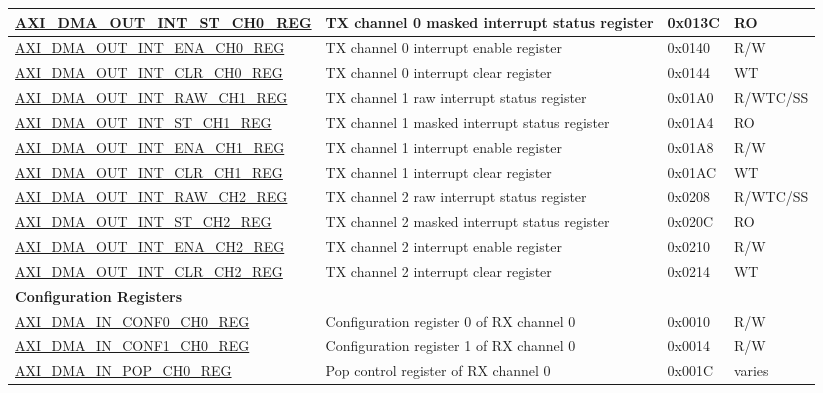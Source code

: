 \begin{longtable}{ | l | p{10cm} | p{1.3cm} | l | }
\hyperref[regdesc:AXIDMAOUTINTSTCHNREG]{AXI\_DMA\_OUT\_INT\_ST\_CH0\_REG} & TX channel 0 masked interrupt status register & 0x013C & RO \\ \hline
\hyperref[regdesc:AXIDMAOUTINTENACHNREG]{AXI\_DMA\_OUT\_INT\_ENA\_CH0\_REG} & TX channel 0 interrupt enable register & 0x0140 & R/W \\ \hline
\hyperref[regdesc:AXIDMAOUTINTCLRCHNREG]{AXI\_DMA\_OUT\_INT\_CLR\_CH0\_REG} & TX channel 0 interrupt clear register  & 0x0144 & WT \\ \hline
\hyperref[regdesc:AXIDMAOUTINTRAWCHNREG]{AXI\_DMA\_OUT\_INT\_RAW\_CH1\_REG} & TX channel 1 raw interrupt status register & 0x01A0 & R/WTC/SS \\ \hline
\hyperref[regdesc:AXIDMAOUTINTSTCHNREG]{AXI\_DMA\_OUT\_INT\_ST\_CH1\_REG} & TX channel 1 masked interrupt status register & 0x01A4 & RO \\ \hline
\hyperref[regdesc:AXIDMAOUTINTENACHNREG]{AXI\_DMA\_OUT\_INT\_ENA\_CH1\_REG} & TX channel 1 interrupt enable register & 0x01A8 & R/W \\ \hline
\hyperref[regdesc:AXIDMAOUTINTCLRCHNREG]{AXI\_DMA\_OUT\_INT\_CLR\_CH1\_REG} & TX channel 1 interrupt clear register  & 0x01AC & WT \\ \hline
\hyperref[regdesc:AXIDMAOUTINTRAWCHNREG]{AXI\_DMA\_OUT\_INT\_RAW\_CH2\_REG} & TX channel 2 raw interrupt status register & 0x0208 & R/WTC/SS \\ \hline
\hyperref[regdesc:AXIDMAOUTINTSTCHNREG]{AXI\_DMA\_OUT\_INT\_ST\_CH2\_REG} & TX channel 2 masked interrupt status register & 0x020C & RO \\ \hline
\hyperref[regdesc:AXIDMAOUTINTENACHNREG]{AXI\_DMA\_OUT\_INT\_ENA\_CH2\_REG} & TX channel 2 interrupt enable register & 0x0210 & R/W \\ \hline
\hyperref[regdesc:AXIDMAOUTINTCLRCHNREG]{AXI\_DMA\_OUT\_INT\_CLR\_CH2\_REG} & TX channel 2 interrupt clear register  & 0x0214 & WT \\ \hline
\multicolumn{4}{|l|}{\textbf{Configuration Registers}} \\ \hline
\hyperref[regdesc:AXIDMAINCONF0CHNREG]{AXI\_DMA\_IN\_CONF0\_CH0\_REG} & Configuration register 0 of RX channel 0 & 0x0010 & R/W \\ \hline
\hyperref[regdesc:AXIDMAINCONF1CHNREG]{AXI\_DMA\_IN\_CONF1\_CH0\_REG} & Configuration register 1 of RX channel 0 & 0x0014 & R/W \\ \hline
\hyperref[regdesc:AXIDMAINPOPCHNREG]{AXI\_DMA\_IN\_POP\_CH0\_REG} & Pop control register of RX channel 0 & 0x001C & varies \\ \hline

\end{longtable}
